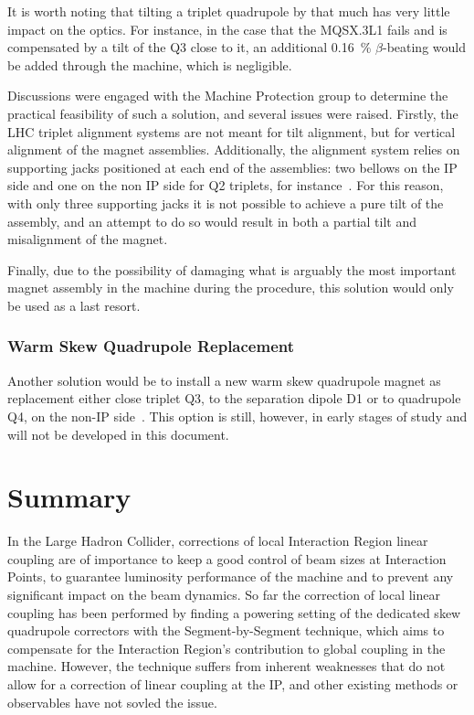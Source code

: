 It is worth noting that tilting a triplet quadrupole by that much has very little impact on the optics.
For instance, in the case that the MQSX.\num{3}L\num{1} fails and is compensated by a tilt of the Q\num{3} close to it, an additional \qty{0.16}{\percent} \(\beta\)-beating would be added through the machine, which is negligible.

Discussions were engaged with the Machine Protection group to determine the practical feasibility of such a solution, and several issues were raised.
Firstly, the LHC triplet alignment systems are not meant for tilt alignment, but for vertical alignment of the magnet assemblies.
Additionally, the alignment system relies on supporting jacks positioned at each end of the assemblies: two bellows on the IP side and one on the non IP side for Q2 triplets, for instance~\cite{IPAC:Micolon:LHC_Triplet_Magnet_Supporting_System, IWAA:Durand:Remote_Positioning_LHC_Inner_Triplet}.
For this reason, with only three supporting jacks it is not possible to achieve a pure tilt of the assembly, and an attempt to do so would result in both a partial tilt and misalignment of the magnet.

Finally, due to the possibility of damaging what is arguably the most important magnet assembly in the machine during the procedure, this solution would only be used as a last resort.

\subsubsection*{Warm Skew Quadrupole Replacement}

Another solution would be to install a new warm skew quadrupole magnet as replacement either close triplet Q\num{3}, to the separation dipole D\num{1} or to quadrupole Q\num{4}, on the non-IP side~\cite{PRES:Persson:Integrated_Lumi_MQSX_Carryovers}.
This option is still, however, in early stages of study and will not be developed in this document.

\section{Summary}

In the Large Hadron Collider, corrections of local Interaction Region linear coupling are of importance to keep a good control of beam sizes at Interaction Points, to guarantee luminosity performance of the machine and to prevent any significant impact on the beam dynamics.
So far the correction of local linear coupling has been performed by finding a powering setting of the dedicated skew quadrupole correctors with the Segment-by-Segment technique, which aims to compensate for the Interaction Region's contribution to global coupling in the machine.
However, the technique suffers from inherent weaknesses that do not allow for a correction of linear coupling at the IP, and other existing methods or observables have not sovled the issue.
\newline

